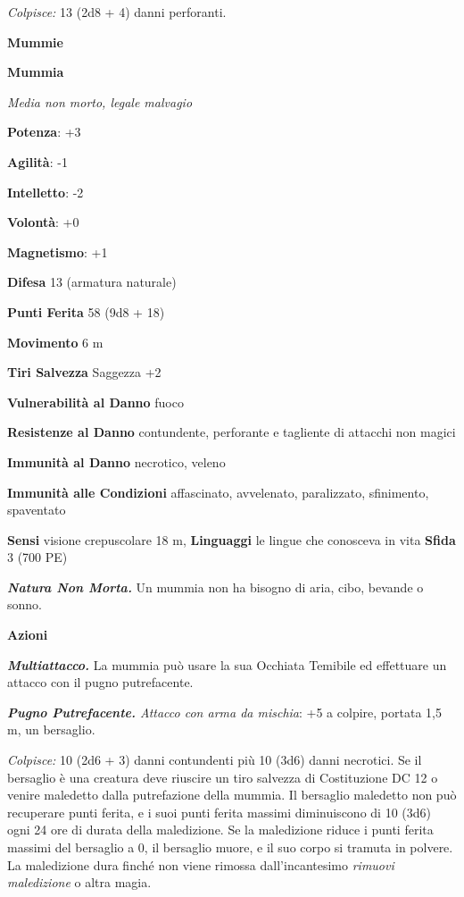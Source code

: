 \begin{multicols}{2}
\emph{Colpisce:} 13 (2d8 + 4) danni perforanti.

\textbf{Mummie}

\textbf{Mummia}

\emph{Media non morto, legale malvagio}

\textbf{Potenza}: +3

\textbf{Agilità}: -1

\textbf{Intelletto}: -2

\textbf{Volontà}: +0

\textbf{Magnetismo}: +1

\textbf{Difesa} 13 (armatura naturale)

\textbf{Punti Ferita} 58 (9d8 + 18)

\textbf{Movimento} 6 m

\textbf{Tiri Salvezza} Saggezza +2

\textbf{Vulnerabilità al Danno} fuoco

\textbf{Resistenze al Danno} contundente, perforante e tagliente di
attacchi non magici

\textbf{Immunità al Danno} necrotico, veleno

\textbf{Immunità alle Condizioni} affascinato, avvelenato, paralizzato,
sfinimento, spaventato

\textbf{Sensi} visione crepuscolare 18 m, 
\textbf{Linguaggi} le lingue che conosceva in vita \textbf{Sfida} 3 (700
PE)

\emph{\textbf{Natura Non Morta.}} Un mummia non ha bisogno di aria,
cibo, bevande o sonno.

\textbf{Azioni}

\emph{\textbf{Multiattacco.}} La mummia può usare la sua Occhiata
Temibile ed effettuare un attacco con il pugno putrefacente.

\emph{\textbf{Pugno Putrefacente.} Attacco con arma da mischia}: +5 a
colpire, portata 1,5 m, un bersaglio.

\emph{Colpisce:} 10 (2d6 + 3) danni contundenti più 10 (3d6) danni
necrotici. Se il bersaglio è una creatura deve riuscire un tiro salvezza
di Costituzione DC 12 o venire maledetto dalla putrefazione della
mummia. Il bersaglio maledetto non può recuperare punti ferita, e i suoi
punti ferita massimi diminuiscono di 10 (3d6) ogni 24 ore di durata
della maledizione. Se la maledizione riduce i punti ferita massimi del
bersaglio a 0, il bersaglio muore, e il suo corpo si tramuta in polvere.
La maledizione dura finché non viene rimossa dall'incantesimo
\emph{rimuovi maledizione} o altra magia.


\end{multicols}
